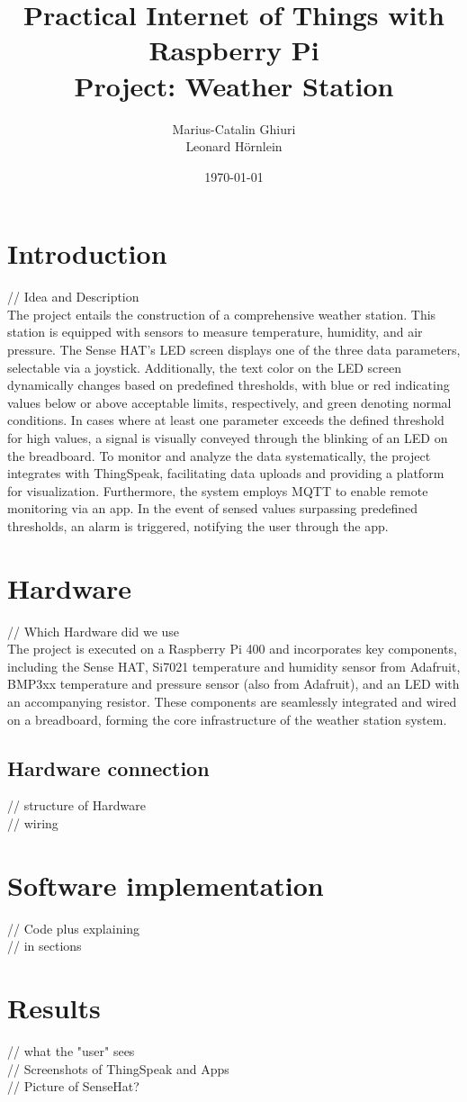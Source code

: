 \documentclass[titlepage]{article}
\title{Practical Internet of Things with Raspberry Pi\\ Project: Weather Station}
\author{Marius-Catalin Ghiuri\\Leonard Hörnlein}
\date{\today}
\begin{document}
\maketitle
\newpage
\tableofcontents
\newpage

\section{Introduction}
// Idea and Description\\
The project entails the construction of a comprehensive weather station. 
This station is equipped with sensors to measure temperature, humidity, and air pressure. 
The Sense HAT's LED screen displays one of the three data parameters, selectable via a joystick. 
Additionally, the text color on the LED screen dynamically changes based on predefined thresholds, with blue or red indicating values below or above acceptable limits, respectively, and green denoting normal conditions. 
In cases where at least one parameter exceeds the defined threshold for high values, a signal is visually conveyed through the blinking of an LED on the breadboard.
To monitor and analyze the data systematically, the project integrates with ThingSpeak, facilitating data uploads and providing a platform for visualization. 
Furthermore, the system employs MQTT to enable remote monitoring via an app. 
In the event of sensed values surpassing predefined thresholds, an alarm is triggered, notifying the user through the app.

\section{Hardware}
// Which Hardware did we use\\
The project is executed on a Raspberry Pi 400 and incorporates key components, including the Sense HAT, Si7021 temperature and humidity sensor from Adafruit, BMP3xx temperature and pressure sensor (also from Adafruit), and an LED with an accompanying resistor. 
These components are seamlessly integrated and wired on a breadboard, forming the core infrastructure of the weather station system.

\subsection{Hardware connection}
// structure of Hardware\\
// wiring

\section{Software implementation}
// Code plus explaining\\
// in sections

\section{Results}
// what the "user" sees\\
// Screenshots of ThingSpeak and Apps\\
// Picture of SenseHat?
\end{document}
